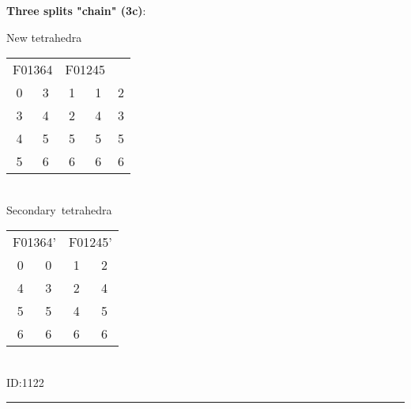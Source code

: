 \documentclass{article}
\begin{document}
	\begin{minipage}{0.5\textwidth}
		\textbf{Three splits "chain" (3c)}:

		\begin{center}
			
		\end{center}
	\end{minipage}
	\begin{minipage}{0.5\textwidth}
		New tetrahedra

		\begin{tabular}{ccccc}
			\hline
			\multicolumn{2}{c}{F01364} & \multicolumn{2}{c}{F01245} &\\
			0 & 3 & 1 & 1 & 2 \\
			3 & 4 & 2 & 4 & 3 \\
			4 & 5 & 5 & 5 & 5 \\
			5 & 6 & 6 & 6 & 6
		\end{tabular}
		\\

		Secondary~tetrahedra

		\begin{tabular}{cccc}
			\hline
			\multicolumn{2}{c}{F01364'} & \multicolumn{2}{c}{F01245'} \\
			0 & 0 & 1 & 2 \\
			4 & 3 & 2 & 4 \\
			5 & 5 & 4 & 5 \\
			6 & 6 & 6 & 6
		\end{tabular}
		\\

		ID:1122
	\end{minipage}

	\rule{\textwidth}{0.5pt}
	\\
\end{document}
